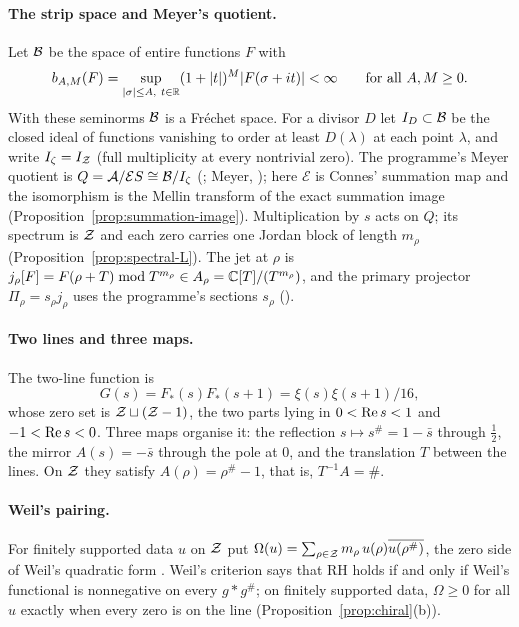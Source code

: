 \paragraph{The strip space and Meyer's quotient.}
Let $\mathcal{B}$ be the space of entire functions $F$ with
\[
b_{A,M}(F)=\sup_{|\sigma|\le A,\ t\in\R}(1+|t|)^M|F(\sigma+it)|<\infty\qquad\text{for all }A,M\ge0.
\]
With these seminorms $\mathcal{B}$ is a Fréchet space.
For a divisor $D$ let $I_D\subset\mathcal{B}$ be the closed ideal of functions vanishing to order at least $D(\lambda)$ at each point $\lambda$, and write $I_\zeta=I_{\mathcal{Z}}$ (full multiplicity at every nontrivial zero).
The programme's Meyer quotient is $Q=\mathcal{A}/\mathcal{E}S\cong\mathcal{B}/I_\zeta$ (; Meyer, \cite{Meyer}); here $\mathcal{E}$ is Connes' summation map and the isomorphism is the Mellin transform of the exact summation image (Proposition~\ref{prop:summation-image}).
Multiplication by $s$ acts on $Q$; its spectrum is $\mathcal{Z}$ and each zero carries one Jordan block of length $m_\rho$ (Proposition~\ref{prop:spectral-L}).
The jet at $\rho$ is $j_\rho[F]=F(\rho+T)\bmod T^{m_\rho}\in A_\rho=\mathbb{C}[T]/(T^{m_\rho})$, and the primary projector $\Pi_\rho=s_\rho j_\rho$ uses the programme's sections $s_\rho$ ().

\paragraph{Two lines and three maps.}
The two-line function is
\[
G(s)=F_*(s)F_*(s+1)=\xi(s)\xi(s+1)/16,
\]
whose zero set is $\mathcal{Z}\sqcup(\mathcal{Z}-1)$, the two parts lying in $0<\operatorname{Re} s<1$ and $-1<\operatorname{Re} s<0$.
Three maps organise it: the reflection $s\mapsto s^{\#}=1-\bar s$ through $\tfrac12$, the mirror $A(s)=-\bar s$ through the pole at $0$, and the translation $T$ between the lines.
On $\mathcal{Z}$ they satisfy $A(\rho)=\rho^{\#}-1$, that is, $T^{-1}A=\#$.

\paragraph{Weil's pairing.}
For finitely supported data $u$ on $\mathcal{Z}$ put $\Omega(u)=\sum_{\rho\in\mathcal{Z}}m_\rho\,u(\rho)\overline{u(\rho^{\#})}$, the zero side of Weil's quadratic form \cite{Weil,Bombieri}.
Weil's criterion says that RH holds if and only if Weil's functional is nonnegative on every $g*g^{\#}$; on finitely supported data, $\Omega\ge0$ for all $u$ exactly when every zero is on the line (Proposition~\ref{prop:chiral}(b)).
